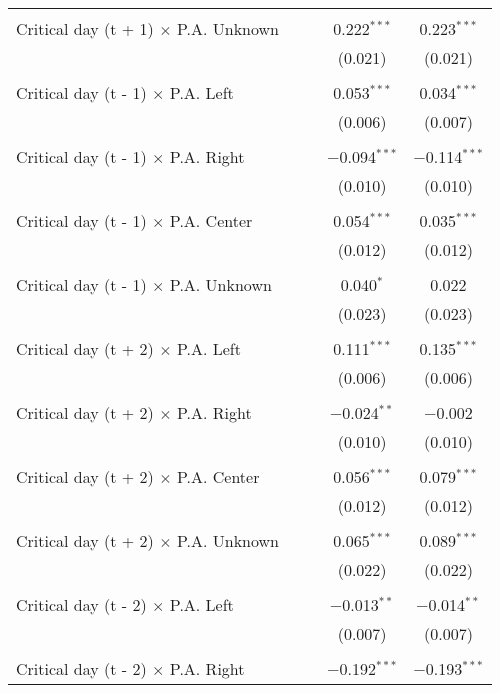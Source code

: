 \documentclass[
]{article}
\begin{document}
\begin{table}[!htbp]
{\begin{tabular}{@{\extracolsep{5pt}}lcccc}
  & & & & \\ 
 Critical day (t + 1) $\times$ P.A. Unknown &  &  & 0.222$^{***}$ & 0.223$^{***}$ \\ 
  &  &  & (0.021) & (0.021) \\ 
  & & & & \\ 
 Critical day (t - 1) $\times$ P.A. Left &  &  & 0.053$^{***}$ & 0.034$^{***}$ \\ 
  &  &  & (0.006) & (0.007) \\ 
  & & & & \\ 
 Critical day (t - 1) $\times$ P.A. Right &  &  & $-$0.094$^{***}$ & $-$0.114$^{***}$ \\ 
  &  &  & (0.010) & (0.010) \\ 
  & & & & \\ 
 Critical day (t - 1) $\times$ P.A. Center &  &  & 0.054$^{***}$ & 0.035$^{***}$ \\ 
  &  &  & (0.012) & (0.012) \\ 
  & & & & \\ 
 Critical day (t - 1) $\times$ P.A. Unknown &  &  & 0.040$^{*}$ & 0.022 \\ 
  &  &  & (0.023) & (0.023) \\ 
  & & & & \\ 
 Critical day (t + 2) $\times$ P.A. Left &  &  & 0.111$^{***}$ & 0.135$^{***}$ \\ 
  &  &  & (0.006) & (0.006) \\ 
  & & & & \\ 
 Critical day (t + 2) $\times$ P.A. Right &  &  & $-$0.024$^{**}$ & $-$0.002 \\ 
  &  &  & (0.010) & (0.010) \\ 
  & & & & \\ 
 Critical day (t + 2) $\times$ P.A. Center &  &  & 0.056$^{***}$ & 0.079$^{***}$ \\ 
  &  &  & (0.012) & (0.012) \\ 
  & & & & \\ 
 Critical day (t + 2) $\times$ P.A. Unknown &  &  & 0.065$^{***}$ & 0.089$^{***}$ \\ 
  &  &  & (0.022) & (0.022) \\ 
  & & & & \\ 
 Critical day (t - 2) $\times$ P.A. Left &  &  & $-$0.013$^{**}$ & $-$0.014$^{**}$ \\ 
  &  &  & (0.007) & (0.007) \\ 
  & & & & \\ 
 Critical day (t - 2) $\times$ P.A. Right &  &  & $-$0.192$^{***}$ & $-$0.193$^{***}$ \\ 

\end{tabular}}
\end{table}
\end{document}
